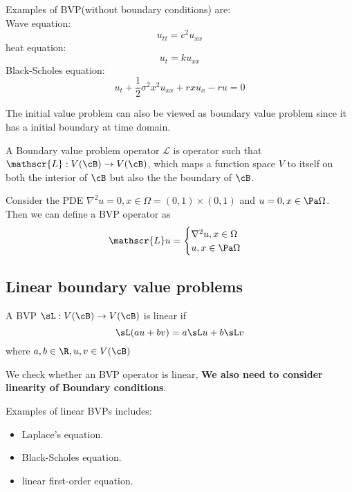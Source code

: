 \begin{refsection}
\begin{example}
Examples of BVP(without boundary conditions) are:\\
Wave equation:
$$u_{tt} = c^2u_{xx}$$
heat equation:
$$u_t = ku_{xx}$$
Black-Scholes equation:
$$u_t + \frac{1}{2}\sigma^2 x^2 u_{xx} + rxu_x -ru = 0$$
\end{example}



\begin{remark}
The initial value problem can also be viewed as boundary value problem since it has a initial boundary at time domain.
\end{remark}

\begin{definition}\cite[15]{griffiths2015essential}
A Boundary value problem operator $\mathscr{L}$ is operator such that $\mathscr{L}:V(\cB) \to V(\cB)$, which maps a function space $V$ to itself on both the interior of $\cB$ but also the the boundary of $\cB$.
\end{definition}

\begin{example}
Consider the PDE $\nabla^2 u = 0, x\in \Omega = (0,1)\times(0,1)$ and $u=0,x\in \Pa\Omega$. Then we can define a BVP operator as
$$\mathscr{L}u = \begin{cases}
\nabla^2 u, x\in \Omega\\
u,x\in \Pa\Omega
\end{cases}$$
\end{example}



\subsection{Linear boundary value problems}

\begin{definition}\cite[17]{griffiths2015essential}
	A BVP $\sL:V(\cB)\to V(\cB)$ is linear if 
	$$\sL(au+bv)=a\sL u+ b\sL v$$
	where $a,b\in \R,u,v \in V(\cB)$ 
\end{definition}

\begin{remark}
	We check whether an BVP operator is linear, \textbf{We also need to consider linearity of Boundary conditions}. 
\end{remark}

\begin{example}\cite[18]{griffiths2015essential}
Examples of linear BVPs includes:
\begin{itemize}
	\item Laplace's equation.
	\item Black-Scholes equation.
	\item linear first-order equation.
\end{itemize}
\end{example}


\end{refsection}
